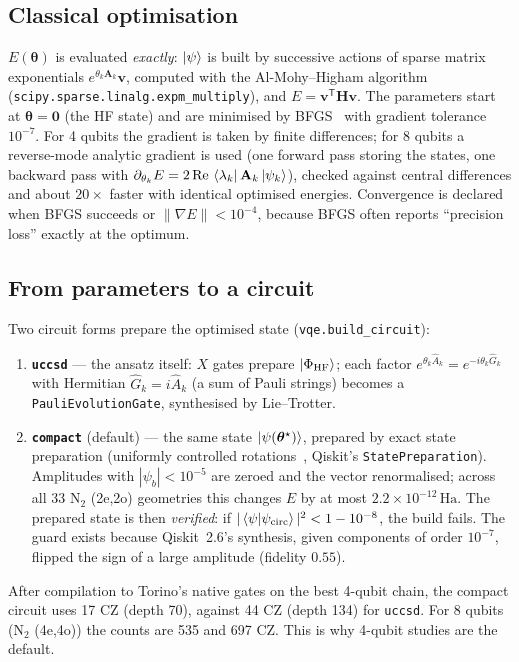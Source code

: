\documentclass[10pt,a4paper]{article}
\newcommand{\Ha}{\,\mathrm{Ha}}
\newcommand{\code}[1]{\texttt{\small #1}}
\begin{document}
\subsection{Classical optimisation}
$E(\bm\theta)$ is evaluated \emph{exactly}: $\ket{\psi}$ is built by successive actions of sparse matrix exponentials $e^{\theta_k\mathbf A_k}\mathbf v$, computed with the Al-Mohy--Higham algorithm~\cite{AlMohy2011} (\code{scipy.sparse.linalg.expm\_multiply}), and $E=\mathbf v^{\mathsf T}\mathbf H\mathbf v$. The parameters start at $\bm\theta=\bm0$ (the HF state) and are minimised by BFGS~\cite{Nocedal2006} with gradient tolerance $10^{-7}$. For 4 qubits the gradient is taken by finite differences; for 8 qubits a reverse-mode analytic gradient is used (one forward pass storing the states, one backward pass with $\partial_{\theta_k}E=2\,\mathrm{Re}\,\bra{\lambda_k}\mathbf A_k\ket{\psi_k}$), checked against central differences and about $20\times$ faster with identical optimised energies. Convergence is declared when BFGS succeeds or $\|\nabla E\|<10^{-4}$, because BFGS often reports ``precision loss'' exactly at the optimum.

\subsection{From parameters to a circuit}
Two circuit forms prepare the optimised state (\code{vqe.build\_circuit}):
\begin{enumerate}
\item \textbf{\code{uccsd}} --- the ansatz itself: $X$ gates prepare $\ket{\Phi_{\mathrm{HF}}}$; each factor $e^{\theta_k\hat A_k}=e^{-i\theta_k\hat G_k}$ with Hermitian $\hat G_k=i\hat A_k$ (a sum of Pauli strings) becomes a \code{PauliEvolutionGate}, synthesised by Lie--Trotter.
\item \textbf{\code{compact}} (default) --- the same state $\ket{\psi(\bm\theta^\star)}$, prepared by exact state preparation (uniformly controlled rotations~\cite{Shende2006}, Qiskit's \code{StatePreparation}). Amplitudes with $|\psi_b|<10^{-5}$ are zeroed and the vector renormalised; across all 33 N$_2$ (2e,2o) geometries this changes $E$ by at most $2.2\times10^{-12}\Ha$. The prepared state is then \emph{verified}: if $|\braket{\psi|\psi_{\mathrm{circ}}}|^2<1-10^{-8}$, the build fails. The guard exists because Qiskit~2.6's synthesis, given components of order $10^{-7}$, flipped the sign of a large amplitude (fidelity $0.55$).
\end{enumerate}
After compilation to Torino's native gates on the best 4-qubit chain, the compact circuit uses 17 CZ (depth 70), against 44 CZ (depth 134) for \code{uccsd}. For 8 qubits (N$_2$ (4e,4o)) the counts are 535 and 697 CZ. This is why 4-qubit studies are the default.
\end{document}
